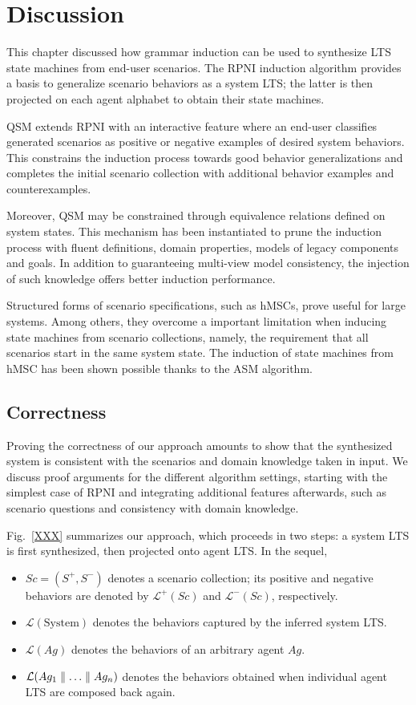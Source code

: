 \section{Discussion\label{section:inductive-discussion}}

This chapter discussed how grammar induction can be used to synthesize LTS state machines from end-user scenarios. The RPNI induction algorithm provides a basis to generalize scenario behaviors as a system LTS; the latter is then projected on each agent alphabet to obtain their state machines. 

QSM extends RPNI with an interactive feature where an end-user classifies generated scenarios as positive or negative examples of desired system behaviors. This constrains the induction process towards good behavior generalizations and completes the initial scenario collection with additional behavior examples and counterexamples.

Moreover, QSM may be constrained through equivalence relations defined on system states. This mechanism has been instantiated to prune the induction process with fluent definitions, domain properties, models of legacy components and goals. In addition to guaranteeing multi-view model consistency, the injection of such knowledge offers better induction performance.

Structured forms of scenario specifications, such as hMSCs, prove useful for large systems. Among others, they overcome a important limitation when inducing state machines from scenario collections, namely, the requirement that all scenarios start in the same system state. The induction of state machines from hMSC has been shown possible thanks to the ASM algorithm.

\subsection{Correctness\label{subsection:inductive-discussion-correctness}}

Proving the correctness of our approach amounts to show that the synthesized system is consistent with the scenarios and domain knowledge taken in input. We discuss proof arguments for the different algorithm settings, starting with the simplest case of RPNI and integrating additional features afterwards, such as scenario questions and consistency with domain knowledge.

Fig.~\ref{XXX} summarizes our approach, which proceeds in two steps: a system LTS is first synthesized, then projected onto agent LTS. In the sequel,
\begin{itemize}
\item $Sc = (S^+,S^-)$ denotes a scenario collection; its positive and negative behaviors are denoted by $\mathcal{L}^+(Sc)$ and $\mathcal{L}^-(Sc)$, respectively.
\item $\mathcal{L}(\mbox{System})$ denotes the behaviors captured by the inferred system LTS.
\item $\mathcal{L}(Ag)$ denotes the behaviors of an arbitrary agent $Ag$.
\item $\mathcal{L}(Ag_1 \parallel \ldots \parallel Ag_n)$ denotes the behaviors obtained when individual agent LTS are composed back again.
\end{itemize}


